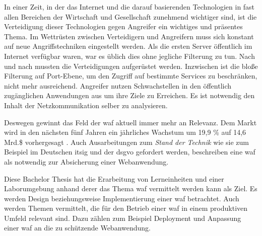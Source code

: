 \label{sec:introuduction}

In einer Zeit, in der das Internet und die darauf basierenden Technologien in fast allen Bereichen der Wirtschaft und Gesellschaft zunehmend wichtiger sind, ist die Verteidigung dieser Technologien gegen Angreifer ein wichtiges und präsentes Thema.
Im Wettrüsten zwischen Verteidigern und Angreifern muss sich konstant auf neue Angriffstechniken eingestellt werden.
Als die ersten Server öffentlich im Internet verfügbar waren, war es üblich dies ohne jegliche Filterung zu tun.
Nach und nach mussten die Verteidigungen aufgerüstet werden.
Inzwischen ist die bloße Filterung auf Port-Ebene, um den Zugriff auf bestimmte Services zu beschränken, nicht mehr ausreichend.
Angreifer nutzen Schwachstellen in den öffentlich zugänglichen Anwendungen aus um ihre Ziele zu Erreichen.
Es ist notwendig den Inhalt der Netzkommunikation selber zu analysieren.


Deswegen gewinnt das Feld der \ac{waf} aktuell immer mehr an Relevanz.
Dem Markt wird in den nächsten fünf Jahren ein jährliches Wachstum um 19,9 \% auf 14,6 Mrd.\$ vorhergesagt \cite{WebApplicationFirewall}.
Auch Ausarbeitungen zum \textit{Stand der Technik} wie sie zum Beispiel im Deutschen \ac{itsig} und der \ac{dsgvo} gefordert werden, beschreiben eine \ac{waf} als notwendig zur Absicherung einer Webanwendung\cite[3.1.19 Schutz von Webanwendungen]{StandTechnik}.


Diese Bachelor Thesis hat die Erarbeitung von Lerneinheiten und einer Laborumgebung anhand derer das Thema \ac{waf} vermittelt werden kann als Ziel.
Es werden Design beziehungsweise Implementierung einer \ac{waf} betrachtet.
Auch werden Themen vermittelt, die für den Betrieb einer \ac{waf} in einem produktiven Umfeld relevant sind.
Dazu zählen zum Beispiel Deployment und Anpassung einer \ac{waf} an die zu schützende Webanwendung.


\pagebreak